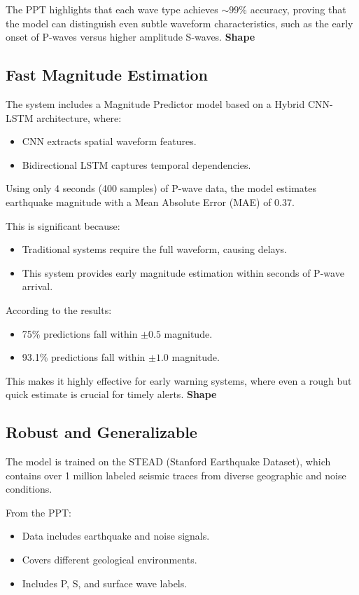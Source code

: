 \documentclass[a4paper,12pt]{report}
\begin{document}
The PPT highlights that each wave type achieves \(\sim 99\%\) accuracy, proving that the model can distinguish even subtle waveform characteristics, such as the early onset of P-waves versus higher amplitude S-waves.
\textbf{Shape}

\subsection{Fast Magnitude Estimation}
The system includes a Magnitude Predictor model based on a Hybrid CNN-LSTM architecture, where:
\begin{itemize}
\item CNN extracts spatial waveform features.
\item Bidirectional LSTM captures temporal dependencies.
\end{itemize}

Using only 4 seconds (400 samples) of P-wave data, the model estimates earthquake magnitude with a Mean Absolute Error (MAE) of 0.37.

This is significant because:
\begin{itemize}
\item Traditional systems require the full waveform, causing delays.
\item This system provides early magnitude estimation within seconds of P-wave arrival.
\end{itemize}

According to the results:
\begin{itemize}
\item 75\% predictions fall within \(\pm 0.5\) magnitude.
\item 93.1\% predictions fall within \(\pm 1.0\) magnitude.
\end{itemize}

This makes it highly effective for early warning systems, where even a rough but quick estimate is crucial for timely alerts.
\textbf{Shape}

\subsection{Robust and Generalizable}
The model is trained on the STEAD (Stanford Earthquake Dataset), which contains over 1 million labeled seismic traces from diverse geographic and noise conditions.

From the PPT:
\begin{itemize}
\item Data includes earthquake and noise signals.
\item Covers different geological environments.
\item Includes P, S, and surface wave labels.
\end{itemize}
\end{document}
